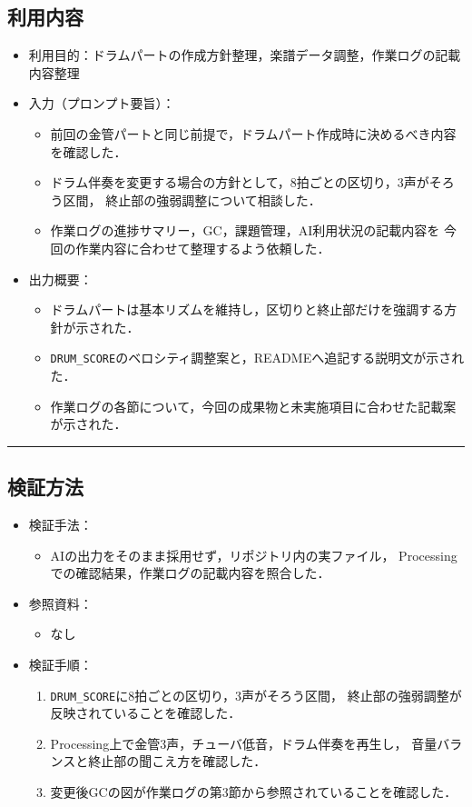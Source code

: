 \documentclass[uplatex,dvipdfmx,a4paper,11pt]{jsarticle}
\newcommand{\sectionrule}{\par\medskip\noindent\rule{\linewidth}{0.6pt}\par\medskip}
\begin{document}
\subsection{利用内容}

\begin{itemize}
  \item 利用目的：ドラムパートの作成方針整理，楽譜データ調整，作業ログの記載内容整理
  \item 入力（プロンプト要旨）：
    \begin{itemize}
      \item {}前回の金管パートと同じ前提で，ドラムパート作成時に決めるべき内容を確認した．
      \item {}ドラム伴奏を変更する場合の方針として，8拍ごとの区切り，3声がそろう区間，
        終止部の強弱調整について相談した．
      \item {}作業ログの進捗サマリー，GC，課題管理，AI利用状況の記載内容を
        今回の作業内容に合わせて整理するよう依頼した．
    \end{itemize}
  \item 出力概要：
    \begin{itemize}
      \item {}ドラムパートは基本リズムを維持し，区切りと終止部だけを強調する方針が示された．
      \item {}\texttt{DRUM\_SCORE}のベロシティ調整案と，READMEへ追記する説明文が示された．
      \item {}作業ログの各節について，今回の成果物と未実施項目に合わせた記載案が示された．
    \end{itemize}
\end{itemize}

\sectionrule

\subsection{検証方法}

\begin{itemize}
  \item 検証手法：
    \begin{itemize}
      \item {}AIの出力をそのまま採用せず，リポジトリ内の実ファイル，
        Processingでの確認結果，作業ログの記載内容を照合した．
    \end{itemize}
  \item 参照資料：
    \begin{itemize}
      \item なし
    \end{itemize}
  \item 検証手順：
    \begin{enumerate}
      \item {}\texttt{DRUM\_SCORE}に8拍ごとの区切り，3声がそろう区間，
        終止部の強弱調整が反映されていることを確認した．
      \item {}Processing上で金管3声，チューバ低音，ドラム伴奏を再生し，
        音量バランスと終止部の聞こえ方を確認した．
      \item {}変更後GCの図が作業ログの第3節から参照されていることを確認した．
    \end{enumerate}
\end{itemize}
\end{document}
